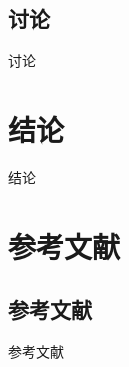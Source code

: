 \documentclass{beamer}
\begin{document}
\subsection{讨论}
\begin{frame}{讨论}
\end{frame}
\section{结论}
\begin{frame}{结论}
\end{frame}
\section{参考文献}
\subsection{参考文献}
\begin{frame}{参考文献}
    
\end{frame}
\end{document}
